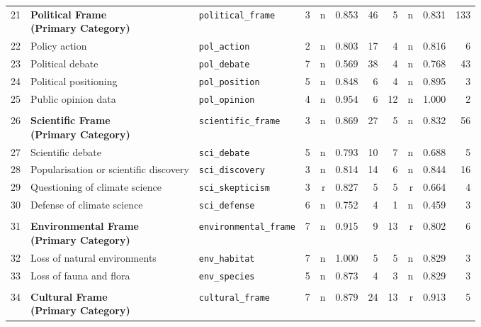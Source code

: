\begin{longtable}{p{0.5cm}p{4.0cm}p{3.0cm}rrrrrrrr}
\midrule
\rowcolor{gray!8}
\multicolumn{11}{l}{\textit{Political Frame}} \\
\midrule
21 & \textbf{Political Frame\newline (Primary Category)} & \texttt{political\_frame} & 3 & n & 0.853 & 46 & 5 & n & 0.831 & 133 \\
\cmidrule(lr){1-11}
22 & Policy action & \texttt{pol\_action} & 2 & n & 0.803 & 17 & 4 & n & 0.816 & 6 \\
23 & Political debate & \texttt{pol\_debate} & 7 & n & 0.569 & 38 & 4 & n & 0.768 & 43 \\
24 & Political positioning & \texttt{pol\_position} & 5 & n & 0.848 & 6 & 4 & n & 0.895 & 3 \\
25 & Public opinion data & \texttt{pol\_opinion} & 4 & n & 0.954 & 6 & 12 & n & 1.000 & 2 \\
\midrule
\rowcolor{gray!8}
\multicolumn{11}{l}{\textit{Scientific Frame}} \\
\midrule
26 & \textbf{Scientific Frame\newline (Primary Category)} & \texttt{scientific\_frame} & 3 & n & 0.869 & 27 & 5 & n & 0.832 & 56 \\
\cmidrule(lr){1-11}
27 & Scientific debate & \texttt{sci\_debate} & 5 & n & 0.793 & 10 & 7 & n & 0.688 & 5 \\
28 & Popularisation or scientific discovery & \texttt{sci\_discovery} & 3 & n & 0.814 & 14 & 6 & n & 0.844 & 16 \\
29 & Questioning of climate science & \texttt{sci\_skepticism} & 3 & r & 0.827 & 5 & 5 & r & 0.664 & 4 \\
30 & Defense of climate science & \texttt{sci\_defense} & 6 & n & 0.752 & 4 & 1 & n & 0.459 & 3 \\
\midrule
\rowcolor{gray!8}
\multicolumn{11}{l}{\textit{Environmental Frame}} \\
\midrule
31 & \textbf{Environmental Frame\newline (Primary Category)} & \texttt{environmental\_frame} & 7 & n & 0.915 & 9 & 13 & r & 0.802 & 6 \\
\cmidrule(lr){1-11}
32 & Loss of natural environments & \texttt{env\_habitat} & 7 & n & 1.000 & 5 & 5 & n & 0.829 & 3 \\
33 & Loss of fauna and flora & \texttt{env\_species} & 5 & n & 0.873 & 4 & 3 & n & 0.829 & 3 \\
\midrule
\rowcolor{gray!8}
\multicolumn{11}{l}{\textit{Cultural Frame}} \\
\midrule
34 & \textbf{Cultural Frame\newline (Primary Category)} & \texttt{cultural\_frame} & 7 & n & 0.879 & 24 & 13 & r & 0.913 & 5 \\

\end{longtable}
